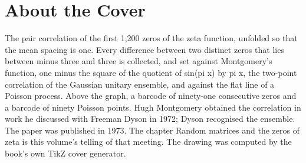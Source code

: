 \backmatter
\cleardoublepage
\chapter*{About the Cover}
\noindent The pair correlation of the first 1,200 zeros of the zeta function, unfolded so that the mean spacing is one. Every difference between two distinct zeros that lies between minus three and three is collected, and set against Montgomery's function, one minus the square of the quotient of sin(pi x) by pi x, the two-point correlation of the Gaussian unitary ensemble, and against the flat line of a Poisson process. Above the graph, a barcode of ninety-one consecutive zeros and a barcode of ninety Poisson points. Hugh Montgomery obtained the correlation in work he discussed with Freeman Dyson in 1972; Dyson recognised the ensemble. The paper was published in 1973. The chapter Random matrices and the zeros of zeta is this volume's telling of that meeting. The drawing was computed by the book's own TikZ cover generator.
